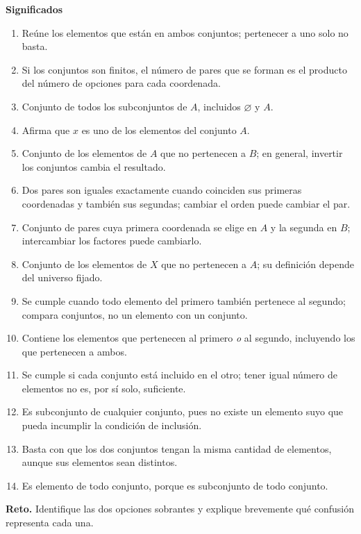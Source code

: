 \documentclass[11pt,a4paper]{article}
\begin{document}
\begin{minipage}[t]{0.61\textwidth}
\textbf{Significados}
\begin{enumerate}[label=\arabic*., leftmargin=*, itemsep=0.38em, topsep=0.4em]
    \item Reúne los elementos que están en ambos conjuntos; pertenecer a uno solo no basta.
    \item Si los conjuntos son finitos, el número de pares que se forman es el producto del número de opciones para cada coordenada.
    \item Conjunto de todos los subconjuntos de $A$, incluidos $\varnothing$ y $A$.
    \item Afirma que $x$ es uno de los elementos del conjunto $A$.
    \item Conjunto de los elementos de $A$ que no pertenecen a $B$; en general, invertir los conjuntos cambia el resultado.
    \item Dos pares son iguales exactamente cuando coinciden sus primeras coordenadas y también sus segundas; cambiar el orden puede cambiar el par.
    \item Conjunto de pares cuya primera coordenada se elige en $A$ y la segunda en $B$; intercambiar los factores puede cambiarlo.
    \item Conjunto de los elementos de $X$ que no pertenecen a $A$; su definición depende del universo fijado.
    \item Se cumple cuando todo elemento del primero también pertenece al segundo; compara conjuntos, no un elemento con un conjunto.
    \item Contiene los elementos que pertenecen al primero \emph{o} al segundo, incluyendo los que pertenecen a ambos.
    \item Se cumple si cada conjunto está incluido en el otro; tener igual número de elementos no es, por sí solo, suficiente.
    \item Es subconjunto de cualquier conjunto, pues no existe un elemento suyo que pueda incumplir la condición de inclusión.
    \item Basta con que los dos conjuntos tengan la misma cantidad de elementos, aunque sus elementos sean distintos.
    \item Es elemento de todo conjunto, porque es subconjunto de todo conjunto.
\end{enumerate}
\end{minipage}

\noindent\textbf{Reto.} Identifique las dos opciones sobrantes y explique brevemente qué confusión representa cada una.
\end{document}
